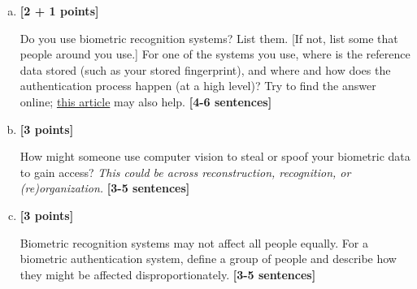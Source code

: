 \documentclass[11pt]{article}
\begin{document}
\begin{enumerate}[(a)]
    \item \textbf{[2 + 1 points]}
    \begin{tcolorbox}[colback=orange!5!white,colframe=orange!75!black]
    Do you use biometric recognition systems? List them. [If not, list some that people around you use.]
    For one of the systems you use, where is the reference data stored (such as your stored fingerprint), and where and how does the authentication process happen (at a high level)? 
    Try to find the answer online; \href{https://ievoreader.com/how-biometric-data-is-stored/}{this article} may also help. \textbf{[4-6 sentences]}
    \end{tcolorbox}
    

    \item
    \textbf{[3 points]}
    \begin{tcolorbox}[colback=orange!5!white,colframe=orange!75!black]
    How might someone use computer vision to steal or spoof your biometric data to gain access? \emph{This could be across reconstruction, recognition, or (re)organization.} \textbf{[3-5 sentences]}
    \end{tcolorbox}



    \item
    \textbf{[3 points]}
    \begin{tcolorbox}[colback=orange!5!white,colframe=orange!75!black]
    Biometric recognition systems may not affect all people equally. For a biometric authentication system, define a group of people and describe how they might be affected disproportionately. \textbf{[3-5 sentences]}
    \end{tcolorbox}
    

\end{enumerate}
\end{document}
